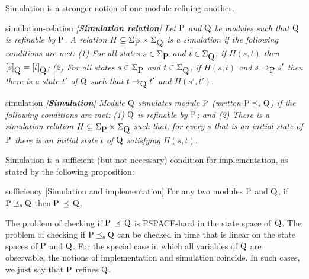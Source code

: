 \mypar








Simulation is a stronger notion of
one module refining another.

\begin{definition}{simulation-relation}\it
  {\em [{\bf Simulation relation}]}
Let $\mbox{P}$ and $\mbox{Q}$ be modules such that $\mbox{Q}$ is refinable by $\mbox{P}$. 
A relation $H \subseteq \Sigma_{\mbox{P}} \times \Sigma_{\mbox{Q}}$ is a 
{\em simulation} if the following conditions are met:
 (1) For all states $s \in \Sigma_{\mbox{P}}$ and 
     $t \in \Sigma_{\mbox{Q}}$, if $H(s, t)$ then 
     $[s]_{\mbox{Q}} = [t]_{\mbox{Q}}$;
 (2) For all states $s \in \Sigma_{\mbox{P}}$ and 
     $t \in \Sigma_{\mbox{Q}}$, if $H(s, t)$ and
     $s \to_{\mbox{P}} s'$ then there is a state $t'$ of $\mbox{Q}$ such that
     $ t \to_{\mbox{Q}} t'$ and $H(s',t')$.
\end{definition}



\begin{definition}{simulation}\it
  {\em [{\bf Simulation}]}
Module $\mbox{Q}$ {\em simulates} module $\mbox{P}$ (written
 $\mbox{P} {\:\preceq_s\:} \mbox{Q}$) 
if the following conditions are met:
 (1) $\mbox{Q}$ is refinable by $\mbox{P}$; and
 (2) There is a simulation relation $H \subseteq \Sigma_{\mbox{P}} \times \Sigma_{\mbox{Q}}$
     such that, for every $s$ that is an initial state of $\mbox{P}$ there is an
     initial state $t$ of $\mbox{Q}$ satisfying $H(s,t)$.
\end {definition}


\mypar
Simulation is a sufficient (but not necessary) condition for
implementation, as stated by the following proposition:

\begin {proposition}{sufficiency}
  [Simulation and implementation]
  For any two modules $\mbox{P}$ and $\mbox{Q}$,
  if $\mbox{P}{\:\preceq_s\:}\mbox{Q}$ then  $\mbox{P}$ $ \preceq$ $ \mbox{Q}$.
\end {proposition}

\mypar
The problem of checking if $\mbox{P}$ $\preceq$ $\mbox{Q}$ is PSPACE-hard in the
state space of~$\mbox{Q}$.  The problem of checking if $\mbox{P}{\:\preceq_s\:}\mbox{Q}$ can
be checked in time that is linear on the state spaces of $\mbox{P}$ and
$\mbox{Q}$. For the special case in which all variables of $\mbox{Q}$ are
observable, the notions of implementation and simulation coincide. In
such cases, we just say that $\mbox{P}$ refines $\mbox{Q}$.

